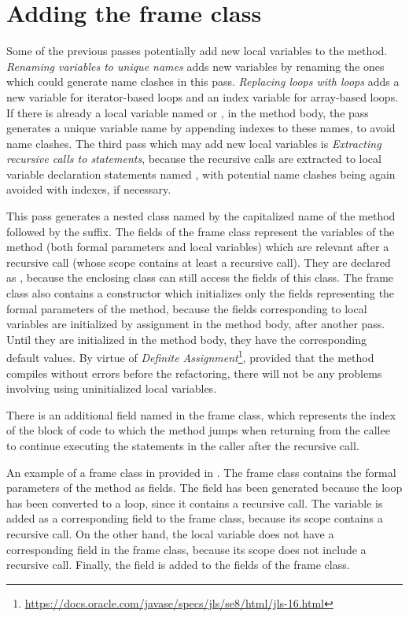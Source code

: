 \section{Adding the frame class}

Some of the previous passes potentially add new local variables to the method. \textit{Renaming variables to unique
names} adds new variables by renaming the ones which could generate name clashes in this pass.
\textit{Replacing  loops with  loops} adds a new  variable for iterator-based
 loops and an index variable  for array-based  loops. If there is already a local
variable named  or , in the method body, the pass generates a unique variable name by appending
indexes to these names, to avoid name clashes. The third pass which may add new local variables is
\textit{Extracting recursive calls to statements}, because the recursive calls are extracted to local variable
declaration statements named , with potential name clashes being again avoided with indexes, if necessary.

This pass generates a  nested class named by the capitalized name of the method followed by the
 suffix. The fields of the frame class represent the variables of the method (both formal parameters and
local variables) which are relevant after a recursive call (whose scope contains at least a recursive call). They are
declared as , because the enclosing class can still access the fields of this class. The frame class also
contains a  constructor which initializes only the fields representing the formal parameters of the
method, because the fields corresponding to local variables are initialized by assignment in the method body,
after another pass. Until they are initialized in the method body, they have the corresponding default values.
By virtue of \textit{Definite Assignment}\footnote{\url{https://docs.oracle.com/javase/specs/jls/se8/html/jls-16.html}},
provided that the method compiles without errors before the refactoring, there will not be any problems involving using
uninitialized local variables.

There is an additional  field named  in the frame class, which represents the index of the
block of code to which the method jumps when returning from the callee to continue executing the statements in the
caller after the recursive call.

An example of a frame class in provided in .
The frame class contains the formal parameters of the method as fields. The field  has been generated
because the  loop has been converted to a  loop, since it contains a recursive call. The
variable  is added as a corresponding field to the frame class, because its scope contains a recursive call.
On the other hand, the local variable  does not have a corresponding field in the frame class, because its
scope does not include a recursive call. Finally, the  field is added to the fields of the frame class.

